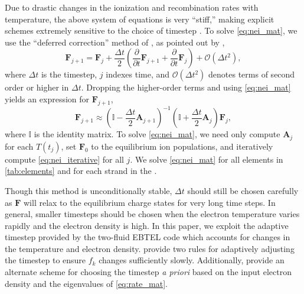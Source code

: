 Due to drastic changes in the ionization and recombination rates with temperature, the above system of equations is very ``stiff,'' making explicit schemes extremely sensitive to the choice of timestep \citep{macneice_numerical_1984,bradshaw_numerical_2009}. To solve \autoref{eq:nei_mat}, we use the ``deferred correction'' method of \citet{npl_modern_1961}, as pointed out by \citet{macneice_numerical_1984},
\begin{equation*}
    \mathbf{F}_{j+1} = \mathbf{F}_j + \frac{\Delta t}{2}\left(\frac{\partial}{\partial t}\mathbf{F}_{j+1} + \frac{\partial}{\partial t}\mathbf{F}_j\right) + \mathcal{O}(\Delta t^2),
\end{equation*}
where $\Delta t$ is the timestep, $j$ indexes time, and $\mathcal{O}(\Delta t^2)$ denotes terms of second order or higher in $\Delta t$. Dropping the higher-order terms and using \autoref{eq:nei_mat} yields an expression for $\mathbf{F}_{j+1}$,
\begin{equation}\label{eq:nei_iterative}
    \mathbf{F}_{j+1} \approx \left(\mathbb{I} - \frac{\Delta t}{2}\mathbf{A}_{j+1}\right)^{-1}\left(\mathbb{I} + \frac{\Delta t}{2}\mathbf{A}_{j}\right)\mathbf{F}_j,
\end{equation}
where $\mathbb{I}$ is the identity matrix. To solve \autoref{eq:nei_mat}, we need only compute $\mathbf{A}_j$ for each $T(t_j)$, set $\mathbf{F}_0$ to the equilibrium ion populations, and iteratively compute \autoref{eq:nei_iterative} for all $j$. We solve \autoref{eq:nei_mat} for all elements in \autoref{tab:elements} and for each strand in the \AR{}.

Though this method is unconditionally stable, $\Delta t$ should still be chosen carefully as $\mathbf{F}$ will relax to the equilibrium charge states for very long time steps. In general, smaller timesteps should be chosen when the electron temperature varies rapidly and the electron density is high. In this paper, we exploit the adaptive timestep provided by the two-fluid EBTEL code which accounts for changes in the temperature and electron density. \citet{macneice_numerical_1984} provide two rules for adaptively adjusting the timestep to ensure $f_k$ changes sufficiently slowly. Additionally, \citet{shen_lagrangian_2015} provide an alternate scheme for choosing the timestep \textit{a priori} based on the input electron density and the eigenvalues of \autoref{eq:rate_mat}.

